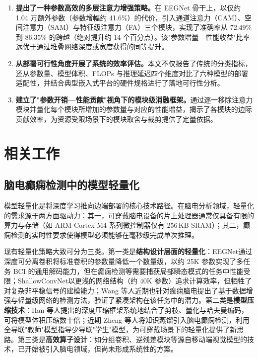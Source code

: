 \documentclass[12pt, a4paper]{article}
\begin{document}
\begin{enumerate}[label=(\arabic*), leftmargin=2.2em]
\item \textbf{提出了一种参数高效的多层注意力增强策略。}\;在 EEGNet 骨干上，以仅约 1.04 万额外参数（参数增幅约 41.6\%）的代价，引入通道注意力（CAM）、空间注意力（SAM）与特征级注意力（FA）三个模块，实现了准确率从 72.49\% 到 86.35\% 的跨越（绝对提升约 14 个百分点）。该"参数增量—性能收益"比率远优于通过堆叠网络深度或宽度获得的同等提升。
\item \textbf{从部署可行性角度开展了系统的效率评估。}\;本文不仅报告了传统的分类指标，还从参数量、模型体积、FLOPs 与推理延迟四个维度对比了六种模型的部署适配性，并结合典型嵌入式平台的硬件规格进行了落地可行性分析。
\item \textbf{建立了"参数开销—性能贡献"视角下的模块级消融框架。}\;通过逐一移除注意力模块并量化每个模块所增加的参数量与对应的性能增益，揭示了各模块的边际贡献效率，为资源受限场景下的模块取舍与裁剪提供了定量依据。
\end{enumerate}

\section{相关工作}

\subsection{脑电癫痫检测中的模型轻量化}

模型轻量化是将深度学习推向边端部署的核心技术路径。在脑电分析领域，轻量化的需求源于两方面驱动力：其一，可穿戴脑电设备的片上处理器通常仅具备有限的算力与存储（如 ARM Cortex-M4 系列微控制器仅有 256\,KB SRAM）\cite{ref_ray2022}；其二，癫痫检测的实时性要求使得模型必须能够在毫秒级完成单次推理。

现有轻量化策略大致可分为三类。第一类是\textbf{结构设计层面的轻量化}：EEGNet\cite{ref_lawhern2018}通过深度可分离卷积\cite{ref_howard2017}将标准卷积的参数量降低一个数量级，以约 25K 参数实现了多任务 BCI 的通用解码能力，但在癫痫检测等需要捕获局部瞬态模式的任务中性能受限；ShallowConvNet\cite{ref_schirrmeister2017}以更浅的网络结构（约 40K 参数）追求计算效率，但牺牲了对复杂非平稳信号的建模能力；Wang 等人\cite{ref_wang2024}近期也针对癫痫脑电提出了基于数据增强与轻量级网络的检测方法，验证了紧凑架构在该任务中的潜力。第二类是\textbf{模型压缩技术}：Han 等人\cite{ref_han2016}提出的深度压缩框架系统地结合了剪枝、量化与哈夫曼编码，可将模型体积压缩数十倍；近期 Zheng 等人\cite{ref_zheng2023}将知识蒸馏引入脑电癫痫检测，利用全导联"教师"模型指导少导联"学生"模型，为可穿戴场景下的轻量化提供了新思路。第三类是\textbf{高效算子设计}：如分组卷积、逆残差模块等源自移动端视觉模型\cite{ref_howard2017}的技术，已开始被引入脑电领域\cite{ref_ingolfsson2020}，但尚未形成系统性的方案。
\end{document}
